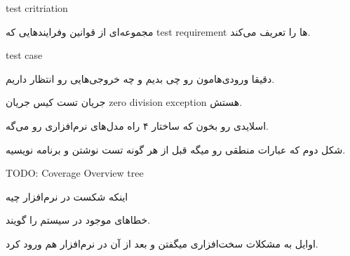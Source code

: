 \documentclass[a4paper]{article}
\begin{document}
test critriation

مجموعه‌ای از قوانین وفرایند‌هایی که test requirement ها را تعریف می‌کند.

test case

دقیقا ورودی‌هامون رو چی بدیم و چه خروجی‌هایی رو انتظار داریم.

جریان تست کیس جریان zero division exception هستش.

اسلایدی رو بخون که ساختار ۴ راه مدل‌های نرم‌افزاری رو می‌گه.

شکل دوم که عبارات منطقی رو میگه قبل از هر گونه تست نوشتن و برنامه نویسیه.

TODO: Coverage Overview tree

اینکه شکست در نرم‌افزار چیه


خطا‌های موجود در سیستم را گویند.



اوایل به مشکلات سخت‌افزاری میگفتن و بعد از آن در نرم‌افزار هم ورود کرد.
\end{document}
